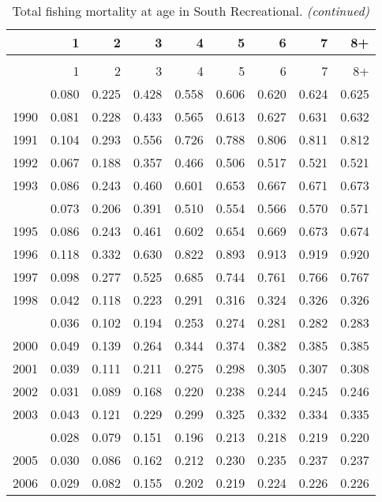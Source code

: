 \documentclass[
]{article}
\begin{document}
\begin{longtable}[t]{lrrrrrrrr}
\caption{\label{tab:South_Recreational-fleet-FAA-table}Total fishing mortality at age in South Recreational.}\\
\toprule
  & 1 & 2 & 3 & 4 & 5 & 6 & 7 & 8+\\
\midrule
\endfirsthead
\caption[]{Total fishing mortality at age in South Recreational. \textit{(continued)}}\\
\toprule
  & 1 & 2 & 3 & 4 & 5 & 6 & 7 & 8+\\
\midrule
\endhead

\endfoot
\bottomrule
\endlastfoot
1989 & 0.080 & 0.225 & 0.428 & 0.558 & 0.606 & 0.620 & 0.624 & 0.625\\
1990 & 0.081 & 0.228 & 0.433 & 0.565 & 0.613 & 0.627 & 0.631 & 0.632\\
1991 & 0.104 & 0.293 & 0.556 & 0.726 & 0.788 & 0.806 & 0.811 & 0.812\\
1992 & 0.067 & 0.188 & 0.357 & 0.466 & 0.506 & 0.517 & 0.521 & 0.521\\
1993 & 0.086 & 0.243 & 0.460 & 0.601 & 0.653 & 0.667 & 0.671 & 0.673\\
\addlinespace
1994 & 0.073 & 0.206 & 0.391 & 0.510 & 0.554 & 0.566 & 0.570 & 0.571\\
1995 & 0.086 & 0.243 & 0.461 & 0.602 & 0.654 & 0.669 & 0.673 & 0.674\\
1996 & 0.118 & 0.332 & 0.630 & 0.822 & 0.893 & 0.913 & 0.919 & 0.920\\
1997 & 0.098 & 0.277 & 0.525 & 0.685 & 0.744 & 0.761 & 0.766 & 0.767\\
1998 & 0.042 & 0.118 & 0.223 & 0.291 & 0.316 & 0.324 & 0.326 & 0.326\\
\addlinespace
1999 & 0.036 & 0.102 & 0.194 & 0.253 & 0.274 & 0.281 & 0.282 & 0.283\\
2000 & 0.049 & 0.139 & 0.264 & 0.344 & 0.374 & 0.382 & 0.385 & 0.385\\
2001 & 0.039 & 0.111 & 0.211 & 0.275 & 0.298 & 0.305 & 0.307 & 0.308\\
2002 & 0.031 & 0.089 & 0.168 & 0.220 & 0.238 & 0.244 & 0.245 & 0.246\\
2003 & 0.043 & 0.121 & 0.229 & 0.299 & 0.325 & 0.332 & 0.334 & 0.335\\
\addlinespace
2004 & 0.028 & 0.079 & 0.151 & 0.196 & 0.213 & 0.218 & 0.219 & 0.220\\
2005 & 0.030 & 0.086 & 0.162 & 0.212 & 0.230 & 0.235 & 0.237 & 0.237\\
2006 & 0.029 & 0.082 & 0.155 & 0.202 & 0.219 & 0.224 & 0.226 & 0.226\\

\end{longtable}
\end{document}
